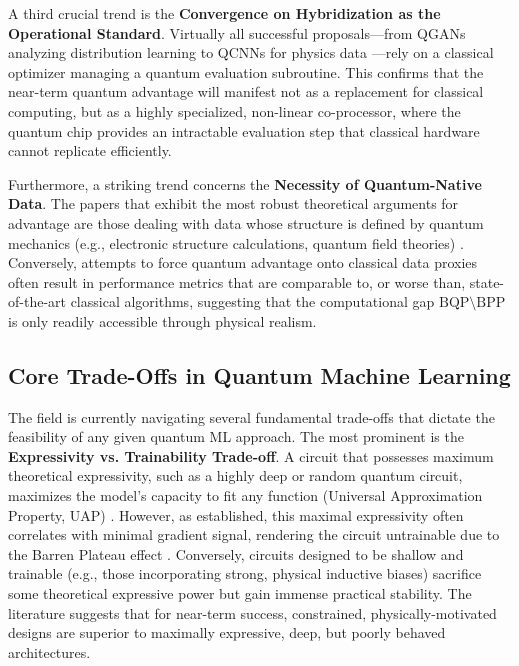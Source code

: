 \documentclass{article}
\begin{document}
A third crucial trend is the \textbf{Convergence on Hybridization as the Operational Standard}. Virtually all successful proposals---from QGANs analyzing distribution learning \cite{zhu2022generative} to QCNNs for physics data \cite{chen2022quantum}---rely on a classical optimizer managing a quantum evaluation subroutine. This confirms that the near-term quantum advantage will manifest not as a replacement for classical computing, but as a highly specialized, non-linear co-processor, where the quantum chip provides an intractable evaluation step that classical hardware cannot replicate efficiently.

Furthermore, a striking trend concerns the \textbf{Necessity of Quantum-Native Data}. The papers that exhibit the most robust theoretical arguments for advantage are those dealing with data whose structure is defined by quantum mechanics (e.g., electronic structure calculations, quantum field theories) \cite{daley2022practical}. Conversely, attempts to force quantum advantage onto classical data proxies often result in performance metrics that are comparable to, or worse than, state-of-the-art classical algorithms, suggesting that the computational gap $\text{BQP} \setminus \text{BPP}$ is only readily accessible through physical realism.

\subsection{Core Trade-Offs in Quantum Machine Learning}

\label{sec:core\_trade\_offs\_in\_quantum\_machine\_learn}

The field is currently navigating several fundamental trade-offs that dictate the feasibility of any given quantum ML approach. The most prominent is the \textbf{Expressivity vs. Trainability Trade-off}. A circuit that possesses maximum theoretical expressivity, such as a highly deep or random quantum circuit, maximizes the model's capacity to fit any function (Universal Approximation Property, UAP) \cite{goto2021universal}. However, as established, this maximal expressivity often correlates with minimal gradient signal, rendering the circuit untrainable due to the Barren Plateau effect \cite{cerezo2021cost}. Conversely, circuits designed to be shallow and trainable (e.g., those incorporating strong, physical inductive biases) sacrifice some theoretical expressive power but gain immense practical stability. The literature suggests that for near-term success, constrained, physically-motivated designs are superior to maximally expressive, deep, but poorly behaved architectures.
\end{document}
